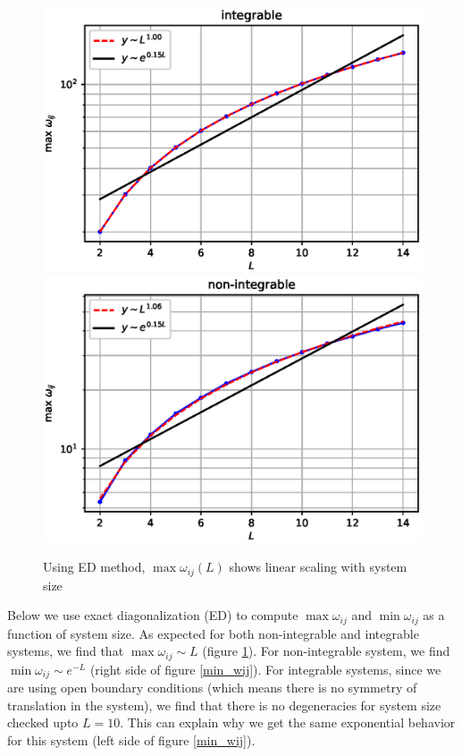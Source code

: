 \documentclass[11pt,a4paper]{article}
\begin{document}
\begin{figure}[!ht]
\begin{center}
\includegraphics[scale=0.53]{new_pics/v2_maxwij_int.eps}
\includegraphics[scale=0.53]{new_pics/v2_maxwij_nonint.eps}
\caption{Using ED method, $\max \omega_{ij}(L)$ shows linear scaling with system size}
\label{max_wij}
\end{center}
\end{figure}

 
Below we use exact diagonalization (ED) to compute $\max \omega_{ij} $ and $\min \omega_{ij}$ as a function of system size. As expected for both non-integrable and integrable systems, we find that $\max \omega_{ij} \sim L$ (figure \ref{max_wij}). For non-integrable system, we find $\min \omega_{ij} \sim e^{-L}$ (right side of figure \ref{min_wij}). For integrable systems, since we are using open boundary conditions (which means there is no symmetry of translation in the system), we find that there is no degeneracies for system size checked upto $L=10$. This can explain why we get the same exponential behavior for this system (left side of figure \ref{min_wij}).
 
\end{document}
